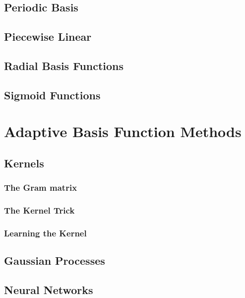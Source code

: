 \documentclass[10pt]{article}
\begin{document}
\subsection{Periodic Basis}

\subsection{Piecewise Linear}

\subsection{Radial Basis Functions}

\subsection{Sigmoid Functions}

\newpage

\section{Adaptive Basis Function Methods}\label{sec:shortcuts}

\subsection{Kernels}

\subsubsection{The Gram matrix}

\subsubsection{The Kernel Trick}

\subsubsection{Learning the Kernel}

\subsection{Gaussian Processes}

\subsection{Neural Networks}
\end{document}
